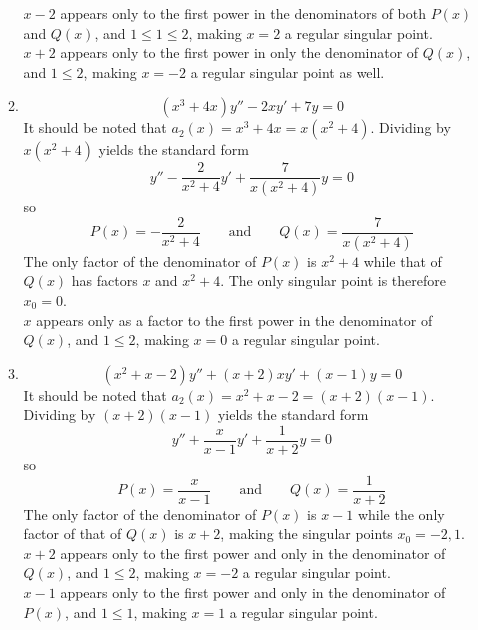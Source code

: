 \documentclass[12pt]{article}
\begin{document}
\begin{enumerate}
\begin{enumerate}[1)]
								\(x - 2\) appears only to the first power in the denominators of both \(P(x)\) and \(Q(x)\), and \(1 \le 1 \le 2\), making \(x = 2\) a regular singular point. \\
								\(x + 2\) appears only to the first power in only the denominator of \(Q(x)\), and \(1 \le 2\), making \(x = -2\) a regular singular point as well.
					\item
						\[\left(x^3 + 4x\right)y'' - 2xy' + 7y = 0\]
							It should be noted that \(a_2(x) = x^3 + 4x = x\left(x^2 + 4\right)\). Dividing by \(x\left(x^2 + 4\right)\) yields the standard form
								\[y'' - \frac{2}{x^2 + 4}y' + \frac{7}{x\left(x^2 + 4\right)}y = 0\]
								so
								\[
									P(x) = -\frac{2}{x^2 + 4} \qquad \text{and} \qquad
									Q(x) = \frac{7}{x\left(x^2 + 4\right)}
								\]
								The only factor of the denominator of \(P(x)\) is \(x^2 + 4\) while that of \(Q(x)\) has factors \(x\) and \(x^2 + 4\). The only singular point is therefore \(x_0 = 0\). \\
								\(x\) appears only as a factor to the first power in the denominator of \(Q(x)\), and \(1 \le 2\), making \(x = 0\) a regular singular point.
					\item
						\[\left(x^2 + x - 2\right)y'' + (x + 2)xy' + (x - 1)y = 0\]
						It should be noted that \(a_2(x) = x^2 + x - 2 = (x + 2)(x - 1)\). Dividing by \((x  + 2)(x - 1)\) yields the standard form
							\[y'' + \frac{x}{x - 1}y' + \frac{1}{x + 2}y = 0\]
							so
							\[
								P(x) = \frac{x}{x - 1} \qquad \text{and} \qquad
								Q(x) = \frac{1}{x + 2}
							\]
							The only factor of the denominator of \(P(x)\) is \(x - 1\) while the  only factor of that of \(Q(x)\) is \(x + 2\), making the singular points \(x_0 = -2, 1\). \\
							\(x + 2\) appears only to the first power and only in the denominator of \(Q(x)\), and \(1 \le 2\), making \(x = -2\) a regular singular point. \\
							\(x - 1\) appears only to the first power and only in the denominator of \(P(x)\), and \(1 \le 1\), making \(x = 1\) a regular singular point.		
				\end{enumerate}
		\end{enumerate}
\end{document}
